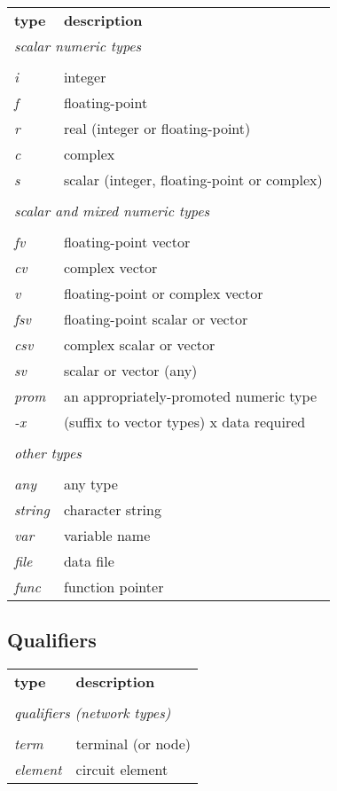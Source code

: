 \begin{tabular}{ll}
{\bf type} & {\bf description} \\
\multicolumn{2}{l}{\sl scalar numeric types} \\
\\
{\it i} & integer \\
{\it f} & floating-point \\
{\it r} & real (integer or floating-point) \\
{\it c} & complex \\
{\it s} & scalar (integer, floating-point or complex) \\
\\
\multicolumn{2}{l}{\sl scalar and mixed numeric types} \\
\\
{\it fv} & floating-point vector \\
{\it cv} & complex vector \\
{\it v} & floating-point or complex vector \\
{\it fsv} & floating-point scalar or vector \\
{\it csv} & complex scalar or vector \\
{\it sv} & scalar or vector (any) \\
{\it prom} & an appropriately-promoted numeric type \\
{\it -x} & (suffix to vector types) x data required \\
\\
\multicolumn{2}{l}{\sl other types} \\
\\
{\it any} & any type \\
{\it string} & character string \\
{\it var} & variable name \\
{\it file} & data file \\
{\it func} & function pointer
\end{tabular}

\subsection{Qualifiers}

\begin{tabular}{ll}
{\bf type} & {\bf description} \\
\\
\multicolumn{2}{l}{\sl qualifiers  (network types)} \\
\\
{\it term} & terminal (or node)\\
{\it element} & circuit element
\end{tabular}


